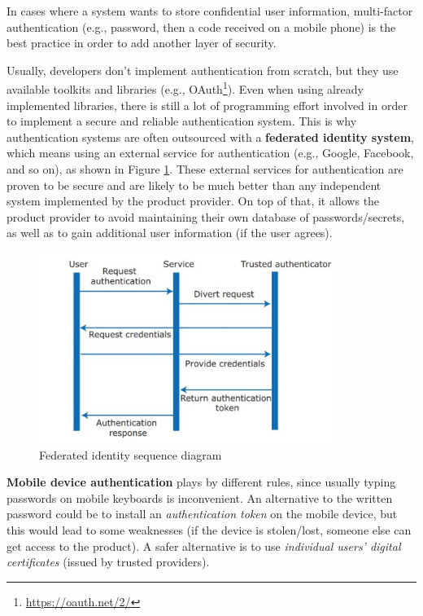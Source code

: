 In cases where a system wants to store confidential user information, multi-factor authentication (e.g., password, then a code received on a mobile phone) is the best practice in order to add another layer of security.

Usually, developers don't implement authentication from scratch, but they use available toolkits and libraries (e.g., OAuth\footnote{\url{https://oauth.net/2/}}). Even when using already implemented libraries, there is still a lot of programming effort involved in order to implement a secure and reliable authentication system. This is why authentication systems are often outsourced with a \textbf{federated identity system}, which means using an external service for authentication (e.g., Google, Facebook, and so on), as shown in Figure \ref{fig:federated-identity}. These external services for authentication are proven to be secure and are likely to be much better than any independent system implemented by the product provider. On top of that, it allows the product provider to avoid maintaining their own database of passwords/secrets, as well as to gain additional user information (if the user agrees).

\begin{figure} [H]
    \centering
    \includegraphics[width=0.85\textwidth]{images/Security/federated-identity.png}
    \caption{Federated identity sequence diagram}
    \label{fig:federated-identity}
\end{figure} 

\textbf{Mobile device authentication} plays by different rules, since usually typing passwords on mobile keyboards is inconvenient. An alternative to the written password could be to install an \textit{authentication token} on the mobile device, but this would lead to some weaknesses (if the device is stolen/lost, someone else can get access to the product). A safer alternative is to use \textit{individual users' digital certificates} (issued by trusted providers).

